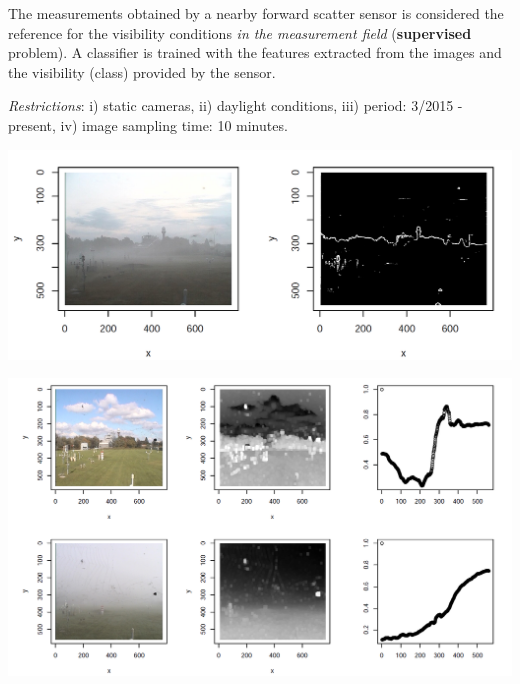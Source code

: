 \documentclass{article}
\begin{document}
The measurements obtained by a nearby forward scatter sensor is considered the
reference for the visibility conditions \emph{in the measurement field}
(\textbf{supervised} problem).\newline
A classifier is trained with the features extracted from the images and the 
visibility (class) provided by the sensor.
\vspace*{0.8cm}

\textit{Restrictions}: 
i) static cameras,
ii) daylight conditions,
iii) period: 3/2015 - present, 
iv) image sampling time: 10 minutes.
\cite{Wauben.Roth2016}




\begin{minipage}[b]{\columnwidth}
	\begin{center}
	\includegraphics[width=0.95\columnwidth]{edges}
	\label{figEdges}
	\end{center}
\end{minipage}

\begin{minipage}[b]{\columnwidth}
	\begin{center}
	\includegraphics[width=0.95\columnwidth]{transmission}
	\label{figTransmission}
	\end{center}
\end{minipage}
\vspace*{-5cm}
\end{document}
